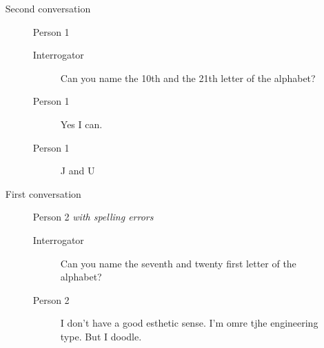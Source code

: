 \begin{itemize}
\begin{description}
\begin{description}
            \end{description}
         \item [Second conversation] Person 1
            \begin{description}
               \item [Interrogator] Can you name the 10th and the 21th letter of the alphabet?
               \item [Person 1] Yes I can.
               \item [Person 1] J and U
            \end{description}
         \item [First conversation] Person 2 \textit{with spelling errors}
            \begin{description}
               \item [Interrogator] Can you name the seventh and twenty first letter of the alphabet?
               \item [Person 2] I don't have a good esthetic sense. I'm omre tjhe engineering type. But I doodle.
            \end{description}
      \end{description}


\end{itemize}
